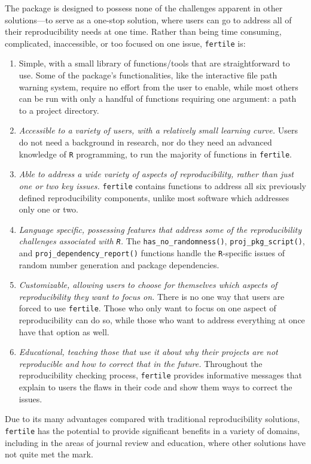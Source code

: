 \documentclass[12pt,twoside]{reedthesis}
\begin{document}
The package is designed to possess none of the challenges apparent in other solutions---to serve as a one-stop solution, where users can go to address all of their reproducibility needs at one time. Rather than being time consuming, complicated, inaccessible, or too focused on one issue, \texttt{fertile} is:
\begin{enumerate}
\def\labelenumi{\arabic{enumi})}
\item
  Simple, with a small library of functions/tools that are straightforward to use. Some of the package's functionalities, like the interactive file path warning system, require no effort from the user to enable, while most others can be run with only a handful of functions requiring one argument: a path to a project directory.
\item
  \emph{Accessible to a variety of users, with a relatively small learning curve.} Users do not need a background in research, nor do they need an advanced knowledge of \texttt{R} programming, to run the majority of functions in \texttt{fertile}.
\item
  \emph{Able to address a wide variety of aspects of reproducibility, rather than just one or two key issues.} \texttt{fertile} contains functions to address all six previously defined reproducibility components, unlike most software which addresses only one or two.
\item
  \emph{Language specific, possessing features that address some of the reproducibility challenges associated with \texttt{R}.} The \texttt{has\_no\_randomness()}, \texttt{proj\_pkg\_script()}, and \texttt{proj\_dependency\_report()} functions handle the \texttt{R}-specific issues of random number generation and package dependencies.
\item
  \emph{Customizable, allowing users to choose for themselves which aspects of reproducibility they want to focus on.} There is no one way that users are forced to use \texttt{fertile}. Those who only want to focus on one aspect of reproducibility can do so, while those who want to address everything at once have that option as well.
\item
  \emph{Educational, teaching those that use it about why their projects are not reproducible and how to correct that in the future.} Throughout the reproducibility checking process, \texttt{fertile} provides informative messages that explain to users the flaws in their code and show them ways to correct the issues.
\end{enumerate}
Due to its many advantages compared with traditional reproducibility solutions, \texttt{fertile} has the potential to provide significant benefits in a variety of domains, including in the areas of journal review and education, where other solutions have not quite met the mark.
\end{document}
